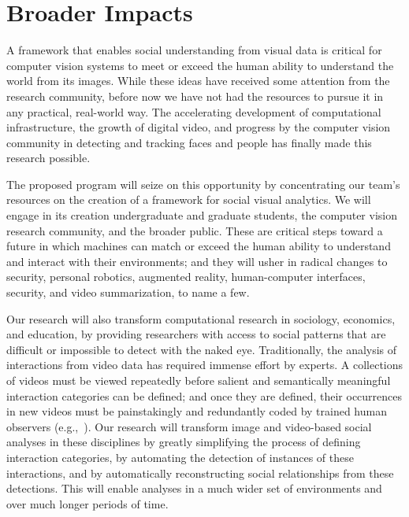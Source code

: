 
\section{Broader Impacts}
\label{sec:impacts}

A framework that enables social understanding from visual data is critical for computer vision systems to meet or exceed the human ability to understand the world from its images. While these ideas have received some attention from the research community, before now we have not had the resources to pursue it in any practical, real-world way. The accelerating development of computational infrastructure, the growth of digital video, and progress by the computer vision community in detecting and tracking faces and people has finally made this research possible. 

The proposed  program will seize on this opportunity by concentrating our team's resources on the creation of a  framework for social visual analytics.  We will engage in its creation undergraduate and graduate students, the computer vision research community, and the broader public. These are critical steps toward a future in which machines can match or exceed the human ability to understand and interact with their environments; and they will usher in radical changes to security, personal robotics, augmented reality, human-computer interfaces, security, and video summarization, to name a few.

Our research will also transform computational research in sociology, economics, and education, by providing researchers with access to social patterns that are difficult or impossible to detect with the naked eye. Traditionally, the analysis of interactions from video data has required immense effort by experts. A collections of videos must be viewed repeatedly before salient and semantically meaningful interaction categories can be defined; and once they are defined, their occurrences in new videos must be painstakingly and redundantly coded by trained human observers (e.g.,~\cite{Scherr2009}). Our research will transform image and video-based social analyses in these disciplines by greatly simplifying the process of defining interaction categories, by automating the detection of instances of these interactions, and by automatically reconstructing social relationships from these detections. This will enable analyses in a much wider set of environments and over much longer periods of time.


